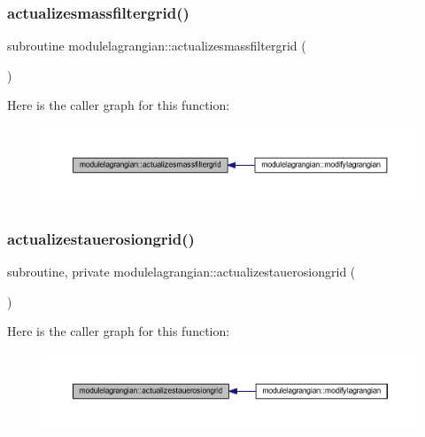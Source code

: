 \subsubsection{\texorpdfstring{actualizesmassfiltergrid()}{actualizesmassfiltergrid()}}
{\footnotesize\ttfamily subroutine modulelagrangian\+::actualizesmassfiltergrid (\begin{DoxyParamCaption}{ }\end{DoxyParamCaption})\hspace{0.3cm}{\ttfamily [private]}}

Here is the caller graph for this function\+:\nopagebreak
\begin{figure}[H]
\begin{center}
\leavevmode
\includegraphics[width=350pt]{namespacemodulelagrangian_ab69c4015dc76dd2209a1eda6139be71f_icgraph}
\end{center}
\end{figure}
\mbox{\label{namespacemodulelagrangian_a9af867ea06d1e0259a9e4cd1a48793bc}} 
\subsubsection{\texorpdfstring{actualizestauerosiongrid()}{actualizestauerosiongrid()}}
{\footnotesize\ttfamily subroutine, private modulelagrangian\+::actualizestauerosiongrid (\begin{DoxyParamCaption}{ }\end{DoxyParamCaption})\hspace{0.3cm}{\ttfamily [private]}}

Here is the caller graph for this function\+:\nopagebreak
\begin{figure}[H]
\begin{center}
\leavevmode
\includegraphics[width=350pt]{namespacemodulelagrangian_a9af867ea06d1e0259a9e4cd1a48793bc_icgraph}
\end{center}
\end{figure}
\mbox{\label{namespacemodulelagrangian_a8223a77ae9396e4ded8f6f220eb1ebe0}} 
